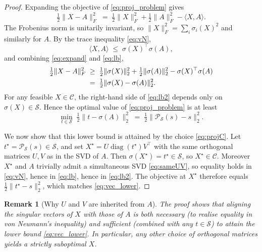 \documentclass[journal]{IEEEtran}
\newtheorem{remark}[theorem]{Remark}
\DeclareMathOperator{\diag}{diag}
\newcommand{\sgm}{\sigma}
\newcommand{\proj}{\mathcal{P}}
\newcommand{\spec}{\mathcal{S}}
\newcommand{\Cset}{\mathcal{C}}
\begin{document}
\begin{proof}
Expanding the objective of \eqref{eq:proj_problem} gives
\begin{equation}\label{eq:expand}
\tfrac{1}{2}\|X - A\|_F^2 \;=\; \tfrac{1}{2}\|X\|_F^2 + \tfrac{1}{2}\|A\|_F^2 - \langle X, A\rangle.
\end{equation}
The Frobenius norm is unitarily invariant, so
$\|X\|_F^2 = \sum_i \sgm_i(X)^2$ and similarly for $A$. By the
trace inequality \eqref{eq:vN},
\begin{equation}\label{eq:lb}
\langle X, A\rangle \;\le\; \sgm(X)^\top \sgm(A),
\end{equation}
and combining \eqref{eq:expand} and \eqref{eq:lb},
\begin{align}
\tfrac{1}{2}\|X - A\|_F^2
&\;\ge\;
\tfrac{1}{2}\|\sgm(X)\|_2^2 + \tfrac{1}{2}\|\sgm(A)\|_2^2 - \sgm(X)^\top \sgm(A) \notag \\
&\;=\;
\tfrac{1}{2}\|\sgm(X) - \sgm(A)\|_2^2.
\label{eq:lb2}
\end{align}
For any feasible $X \in \Cset$, the right-hand side of \eqref{eq:lb2}
depends only on $\sgm(X) \in \spec$. Hence the optimal value of
\eqref{eq:proj_problem} is at least
\begin{equation}\label{eq:vec_lower}
\min_{t \in \spec}\;\tfrac{1}{2}\|t - \sgm(A)\|_2^2
\;=\;\tfrac{1}{2}\|\proj_\spec(s) - s\|_2^2.
\end{equation}

We now show that this lower bound is attained by the choice
\eqref{eq:projC}. Let $t^\star = \proj_\spec(s) \in \spec$, and set
$X^\star = U \diag(t^\star) V^\top$ with the same orthogonal matrices
$U, V$ as in the SVD of $A$. Then $\sgm(X^\star) = t^\star \in \spec$,
so $X^\star \in \Cset$. Moreover $X^\star$ and $A$ trivially admit a
simultaneous SVD \eqref{eq:sameUV}, so equality holds in
\eqref{eq:vN}, hence in \eqref{eq:lb}, hence in \eqref{eq:lb2}. The
objective at $X^\star$ therefore equals
$\tfrac{1}{2}\|t^\star - s\|_2^2$, which matches \eqref{eq:vec_lower}.
\end{proof}

\begin{remark}[Why $U$ and $V$ are inherited from $A$]
The proof shows that aligning the singular vectors of $X$ with those of
$A$ is both \emph{necessary} (to realise equality in von Neumann's
inequality) and \emph{sufficient} (combined with any $t \in \spec$) to
attain the lower bound \eqref{eq:vec_lower}. In particular, any other
choice of orthogonal matrices yields a strictly suboptimal $X$.
\end{remark}
\end{document}
